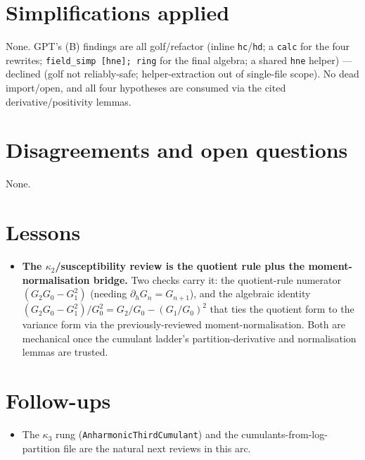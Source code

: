 \documentclass[11pt]{article}
\begin{document}
\section{Simplifications applied}
None. GPT's (B) findings are all golf/refactor (inline \texttt{hc}/\texttt{hd}; a \texttt{calc} for the four
rewrites; \texttt{field\_simp [hne]; ring} for the final algebra; a shared \texttt{hne} helper) --- declined
(golf not reliably-safe; helper-extraction out of single-file scope). No dead import/open, and all four
hypotheses are consumed via the cited derivative/positivity lemmas.

\section{Disagreements and open questions}
None.

\section{Lessons}
\begin{itemize}[noitemsep]
  \item \textbf{The $\kappa_2$/susceptibility review is the quotient rule plus the moment-normalisation bridge.}
    Two checks carry it: the quotient-rule numerator $(G_2 G_0-G_1^2)$ (needing $\partial_h G_n=G_{n+1}$), and
    the algebraic identity $(G_2 G_0-G_1^2)/G_0^2=G_2/G_0-(G_1/G_0)^2$ that ties the quotient form to the
    variance form via the previously-reviewed moment-normalisation. Both are mechanical once the cumulant
    ladder's partition-derivative and normalisation lemmas are trusted.
\end{itemize}

\section{Follow-ups}
\begin{itemize}[noitemsep]
  \item The $\kappa_3$ rung (\texttt{AnharmonicThirdCumulant}) and the cumulants-from-log-partition file are
    the natural next reviews in this arc.
\end{itemize}
\end{document}
